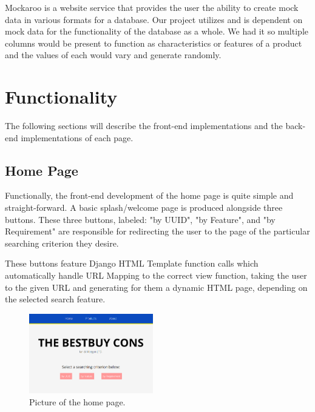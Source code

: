 \documentclass[sigconf]{acmart}
\begin{document}
Mockaroo is a website service that provides the user the ability to create mock data in various formats for a database. Our project utilizes and is dependent on mock data for the functionality of the database as a whole. We had it so multiple columns would be present to function as characteristics or features of a product and the values of each would vary and generate randomly.

\pagebreak
\section{Functionality}\label{functionality}
The following sections will describe the front-end implementations and the back-end implementations of each page.

\subsection{Home Page}\label{home}

Functionally, the front-end development of the home page is quite simple and straight-forward. A basic splash/welcome page is produced alongside three buttons. These three buttons, labeled: "by UUID", "by Feature", and "by Requirement" are responsible for redirecting the user to the page of the particular searching criterion they desire. \par
These buttons feature Django HTML Template function calls which automatically handle URL Mapping to the correct view function, taking the user to the given URL and generating for them a dynamic HTML page, depending on the selected search feature. 

\begin{figure}[H] %
	\centering %
	\includegraphics[width=0.48\textwidth]{Figures/index.png} %
	\caption{Picture of the home page.}
\end{figure}
\end{document}
